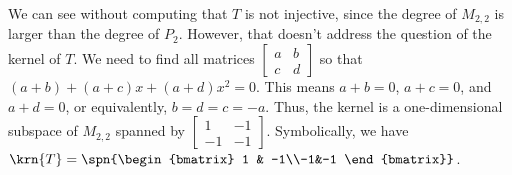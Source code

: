 We can see without computing that $T$ is not injective, since the degree of $M_{2,2}$ is larger than the degree of $P_2$.  However, that doesn't address the question of the kernel of $T$.  We need to find all matrices $\begin{bmatrix} a & b \\ c & d \end{bmatrix}$ so that $(a + b) + (a + c)x + (a + d)x^2 = 0$.  This means $a + b = 0$, $a + c = 0$, and $a + d = 0$, or equivalently, $b = d = c = -a$.  Thus, the kernel is a one-dimensional subspace of $M_{2,2}$ spanned by $\begin{bmatrix} 1 & -1\\-1&-1 \end{bmatrix}$.  Symbolically, we have $\krn{T} = \spn{\begin{bmatrix} 1 & -1\\-1&-1 \end{bmatrix}}$.